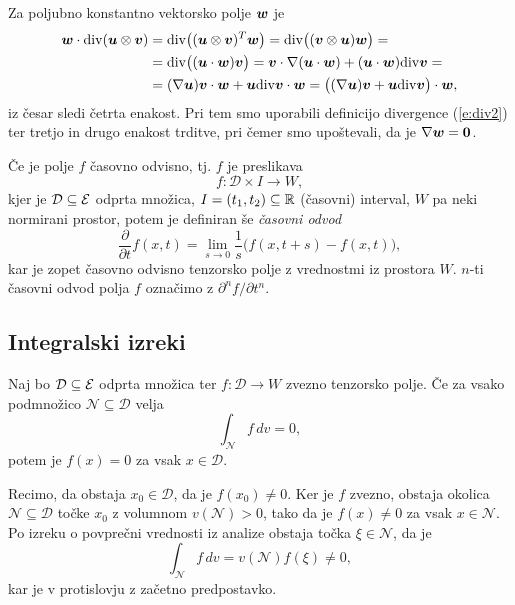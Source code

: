 	Za poljubno konstantno vektorsko polje $\boldsymbol w$ je
	\begin{align*}
		\boldsymbol w\cdot\mathrm{div}(\boldsymbol u\otimes\boldsymbol v)&=\mathrm{div}\big((\boldsymbol u\otimes\boldsymbol v)^T\boldsymbol w\big)=
		\mathrm{div}\big((\boldsymbol v\otimes\boldsymbol u)\boldsymbol w\big)=\\
		&=\mathrm{div}\big((\boldsymbol u\cdot\boldsymbol w)\boldsymbol v\big)=\boldsymbol v\cdot\nabla(\boldsymbol u\cdot\boldsymbol w)+(\boldsymbol u\cdot\boldsymbol w)\mathrm{div}\boldsymbol v=\\
		&=(\nabla\boldsymbol u)\boldsymbol v\cdot\boldsymbol w+\boldsymbol u\mathrm{div}\boldsymbol v\cdot\boldsymbol w=\big((\nabla\boldsymbol u)\boldsymbol v+\boldsymbol u\mathrm{div}\boldsymbol v\big)\cdot\boldsymbol w,
	\end{align*}
	iz česar sledi četrta enakost. Pri tem smo uporabili definicijo divergence (\ref{e:div2}) ter
	tretjo in drugo enakost trditve, pri čemer smo upoštevali, da je $\nabla\boldsymbol w=\mathbf 0$.
\endproof

Če je polje $f$ časovno odvisno, tj. $f$ je preslikava
\[ f\colon\mathcal{D}\times I\to W, \]
kjer je $\mathcal{D}\subseteq\mathcal E$ odprta množica, $I=(t_1,t_2)\subseteq\mathbb R$ (časovni) interval, $W$ pa neki normirani prostor,
potem je definiran še \emph{časovni odvod}
\[ \frac{\partial}{\partial t}f(x,t) = \lim_{s\to 0}\frac{1}{s}\Big(f(x,t+s)-f(x,t)\Big), \]
kar je zopet časovno odvisno tenzorsko polje z vrednostmi iz prostora $W$. $n$-ti
časovni odvod polja $f$ označimo z $\partial^n f/\partial t^n$.


\subsection{Integralski izreki}


\begin{trditev}\label{t:oiz}
	Naj bo $\mathcal{D}\subseteq\mathcal E$ odprta množica ter $f\colon\mathcal{D}\to W$ zvezno tenzorsko polje.
	Če za vsako podmnožico $\mathcal{N}\subseteq\mathcal{D}$ velja
	\[ \int_{\mathcal{N}}f\,dv=0, \]
	potem je $f(x)=0$ za vsak $x\in\mathcal{D}$.
\end{trditev}
\proof
	Recimo, da obstaja $x_0\in\mathcal{D}$, da je $f(x_0)\neq 0$. Ker je $f$ zvezno, obstaja okolica
	$\mathcal{N}\subseteq\mathcal{D}$ točke $x_0$ z volumnom $v(\mathcal{N})>0$, tako da je $f(x)\neq 0$
	za vsak $x\in\mathcal{N}$. Po izreku o povprečni vrednosti iz analize obstaja točka $\xi\in\mathcal{N}$, da je
	\[ \int_{\mathcal{N}}f\,dv=v(\mathcal{N})f(\xi)\neq 0, \]
	kar je v protislovju z začetno predpostavko.
\endproof

